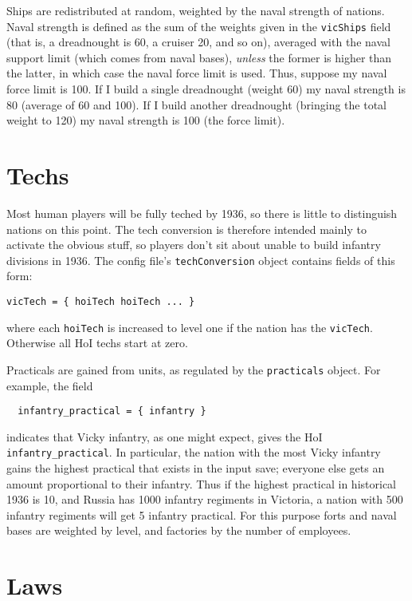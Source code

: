 \documentclass[12pt,ebook,oneside]{book}
\begin{document}
Ships are redistributed at random, weighted by the naval strength of
nations. Naval strength is defined as the sum of the weights given in
the \texttt{vicShips} field (that is, a dreadnought is 60, a cruiser
20, and so on), averaged with the naval support limit (which comes
from naval bases), \emph{unless} the former is higher than the latter,
in which case the naval force limit is used. Thus, suppose my naval
force limit is 100. If I build a single dreadnought (weight 60) my
naval strength is 80 (average of 60 and 100). If I build another
dreadnought (bringing the total weight to 120) my naval strength is
100 (the force limit). 

\section{Techs}

Most human players will be fully teched by 1936, so there is little to
distinguish nations on this point. The tech conversion is therefore
intended mainly to activate the obvious stuff, so players don't sit
about unable to build infantry divisions in 1936. The config file's
\texttt{techConversion} object contains fields of this form:
\begin{verbatim}
vicTech = { hoiTech hoiTech ... }
\end{verbatim}
where each \texttt{hoiTech} is increased to level one if the nation
has the \texttt{vicTech}. Otherwise all HoI techs start at zero. 

Practicals are gained from units, as regulated by the
\texttt{practicals} object. For example, the field
\begin{verbatim}
  infantry_practical = { infantry }
\end{verbatim}
indicates that Vicky infantry, as one might expect, gives the HoI
\texttt{infantry\_practical}. In particular, the nation with the most
Vicky infantry gains the highest practical that exists in the input
save; everyone else gets an amount proportional to their
infantry. Thus if the highest practical in historical 1936 is 10, and
Russia has 1000 infantry regiments in Victoria, a nation with 500
infantry regiments will get 5 infantry practical. For this purpose
forts and naval bases are weighted by level, and factories by the
number of employees. 

\section{Laws}
\end{document}
